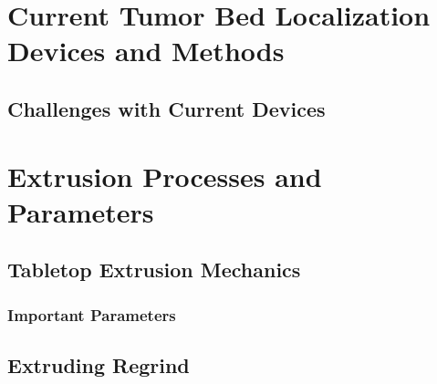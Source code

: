 \section{Current Tumor Bed Localization Devices and Methods\label{sec:literatureReview:currentMethods}}

\subsection{Challenges with Current Devices\label{sec:literatureReview:currentMethods:challenges}}

\section{Extrusion Processes and Parameters\label{sec:literatureReview:extrusion}}

\subsection{Tabletop Extrusion Mechanics\label{sec:literatureReview:extrusion:howWorks}}

\subsubsection{Important Parameters\label{sec:literatureReview:extrusion:parameters}}

\subsection{Extruding Regrind\label{sec:literatureReview:extrusion:regrind}}

